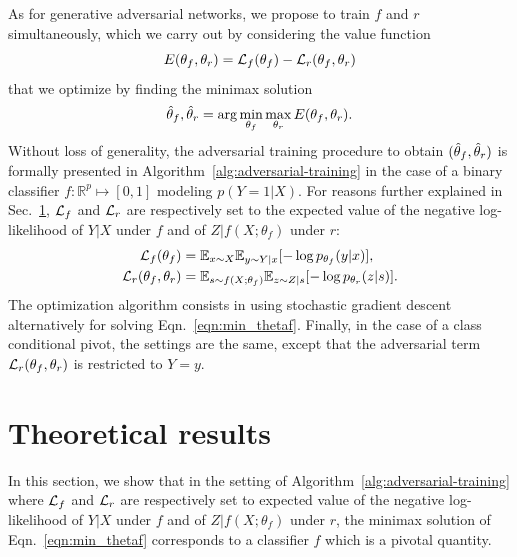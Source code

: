 \documentclass[twocolumn,superscriptaddress,aps]{revtex4-1}
\theoremstyle{plain}
\begin{document}
As for generative adversarial networks, we propose to
train $f$ and $r$ simultaneously, which we carry out by considering
the value function
\begin{equation}
    E(\theta_f, \theta_r) = {\cal L}_f(\theta_f) - {\cal L}_r(\theta_f, \theta_r)
\end{equation}
that we optimize by finding the minimax solution
\begin{equation}\label{eqn:min_thetaf}
    \smash{\hat\theta_f, \hat\theta_r} = \arg \min_{\theta_f} \max_{\theta_r} E(\theta_f, \theta_r).
\end{equation}
Without loss of generality, the adversarial training procedure to obtain
$(\smash{\hat\theta_f}, \smash{\hat\theta_r})$ is formally presented in
Algorithm~\ref{alg:adversarial-training} in the case of a binary classifier $f :
\mathbb{R}^p \mapsto [0,1]$ modeling $p(Y=1|X)$. For reasons further explained
in Sec.~\ref{sec:theory}, ${\cal L}_f$ and ${\cal L}_r$  are respectively set to the
expected value of the
negative log-likelihood of $Y|X$ under $f$ and of $Z|f(X;\theta_f)$ under
$r$:
\begin{align}
    {\cal L}_f(\theta_f) &= \mathbb{E}_{x \sim X}  \mathbb{E}_{y \sim Y|x} [ -\log p_{\theta_f} (y|x) ], \\
    {\cal L}_r(\theta_f, \theta_r) &= \mathbb{E}_{s \sim f(X;\theta_f)}  \mathbb{E}_{z \sim Z|s} [-\log p_{\theta_r} (z|s)].
\end{align}
The optimization algorithm consists in using stochastic gradient descent
alternatively for solving Eqn.~\ref{eqn:min_thetaf}.
Finally, in the case of a class conditional pivot, the settings are the
same, except that the adversarial term ${\cal L}_r(\theta_f, \theta_r)$ is restricted to $Y=y$.





\section{Theoretical results}
\label{sec:theory}

In this section, we show that in the setting of
Algorithm~\ref{alg:adversarial-training} where ${\cal L}_f$ and ${\cal L}_r$ are
respectively set to expected value of the negative log-likelihood of $Y|X$ under
$f$ and of $Z|f(X;\theta_f)$ under $r$, the minimax solution of Eqn.~\ref{eqn:min_thetaf}
corresponds to a classifier
$f$ which is a pivotal quantity.
\end{document}
